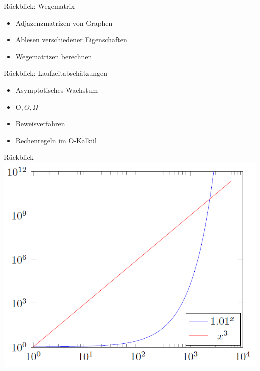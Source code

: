 






\graphicspath{{../figures/}}




\framePrevEpisode

\begin{frame}{Rückblick: Wegematrix}
	\begin{itemize}[<+->]
		\item Adjazenzmatrizen von Graphen
		\item Ablesen verschiedener Eigenschaften
		\item Wegematrizen berechnen
	\end{itemize}
\end{frame}

\begin{frame}{Rückblick: Laufzeitabschätzungen}
	\begin{itemize}[<+->]
		\item Asymptotisches Wachstum
		\item O$, \Theta, \Omega$
		\item Beweisverfahren
		\item Rechenregeln im O-Kalkül
	\end{itemize}
\end{frame}

\begin{frame}{Rückblick}
	\centering
	\includegraphics[scale=0.5]{laufzeit/polyVsExp}
\end{frame}

